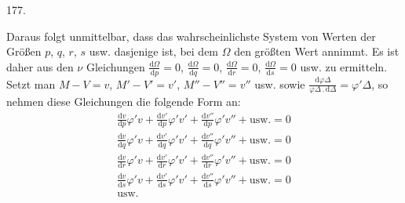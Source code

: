 \begin{center}\hypertarget{native-249-article177}{}177.\end{center}
Daraus folgt unmittelbar, dass das wahrscheinlichste System von Werten der Größen $p$, $q$, $r$, $s$ usw. dasjenige ist, bei dem $\Omega$ den größten Wert annimmt. Es ist daher aus den $\nu$ Gleichungen $\frac{\mathrm{d}\Omega}{\mathrm{d}p}=0$, $\frac{\mathrm{d}\Omega}{\mathrm{d}q}=0$, $\frac{\mathrm{d}\Omega}{\mathrm{d}r}=0$, $\frac{\mathrm{d}\Omega}{\mathrm{d}s}=0$ usw. zu ermitteln. Setzt man $M-V=v$, $M'-V'=v'$, $M''-V''=v''$ usw. sowie $\frac{\mathrm{d}\varphi\Delta}{\varphi\Delta\,.\,\mathrm{d}\Delta}=\varphi'\Delta$, so nehmen diese Gleichungen die folgende Form an:
\[
\begin{gathered}
\frac{\mathrm{d}v}{\mathrm{d}p}\varphi'v+
\frac{\mathrm{d}v'}{\mathrm{d}p}\varphi'v'+
\frac{\mathrm{d}v''}{\mathrm{d}p}\varphi'v''+\text{usw.}=0\\
\frac{\mathrm{d}v}{\mathrm{d}q}\varphi'v+
\frac{\mathrm{d}v'}{\mathrm{d}q}\varphi'v'+
\frac{\mathrm{d}v''}{\mathrm{d}q}\varphi'v''+\text{usw.}=0\\
\frac{\mathrm{d}v}{\mathrm{d}r}\varphi'v+
\frac{\mathrm{d}v'}{\mathrm{d}r}\varphi'v'+
\frac{\mathrm{d}v''}{\mathrm{d}r}\varphi'v''+\text{usw.}=0\\
\frac{\mathrm{d}v}{\mathrm{d}s}\varphi'v+
\frac{\mathrm{d}v'}{\mathrm{d}s}\varphi'v'+
\frac{\mathrm{d}v''}{\mathrm{d}s}\varphi'v''+\text{usw.}=0\\
\text{usw.}
\end{gathered}
\]

